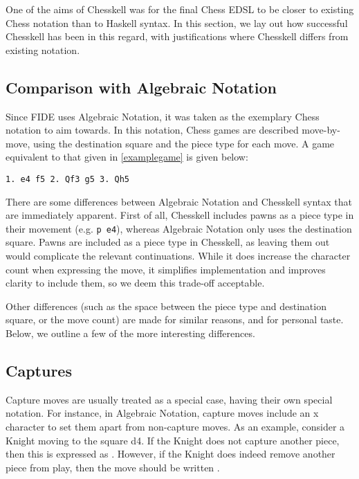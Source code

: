 \documentclass[12pt, a4paper, bibliography=totocnumbered]{scrreprt}
\newcommand{\inline}[1]{\lstinline[basicstyle=\ttfamily\footnotesize]{#1}}
\begin{document}
One of the aims of Chesskell was for the final Chess EDSL to be closer to existing Chess notation than to Haskell syntax. In this section, we lay out how successful Chesskell has been in this regard, with justifications where Chesskell differs from existing notation.

\subsection{Comparison with Algebraic Notation}

Since FIDE uses Algebraic Notation, it was taken as the exemplary Chess notation to aim towards. In this notation, Chess games are described move-by-move, using the destination square and the piece type for each move. A game equivalent to that given in \cref{examplegame} is given below:

\begin{verbatim}
1. e4 f5 2. Qf3 g5 3. Qh5
\end{verbatim}

There are some differences between Algebraic Notation and Chesskell syntax that are immediately apparent. First of all, Chesskell includes pawns as a piece type in their movement (e.g. \inline{p e4}), whereas Algebraic Notation only uses the destination square. Pawns are included as a piece type in Chesskell, as leaving them out would complicate the relevant continuations. While it does increase the character count when expressing the move, it simplifies implementation and improves clarity to include them, so we deem this trade-off acceptable.

Other differences (such as the space between the piece type and destination square, or the move count) are made for similar reasons, and for personal taste. Below, we outline a few of the more interesting differences.

\subsection{Captures}

Capture moves are usually treated as a special case, having their own special notation. For instance, in Algebraic Notation, capture moves include an x character to set them apart from non-capture moves. As an example, consider a Knight moving to the square d4. If the Knight does not capture another piece, then this is expressed as . However, if the Knight does indeed remove another piece from play, then the move should be written .
\end{document}
